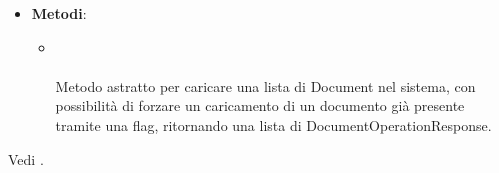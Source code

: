 \documentclass[10pt, a4paper]{article}
\begin{document}
\label{UploadDocumentsUseCaseDettaglio}
\begin{itemize}
    \item \textbf{Metodi}:
    \begin{itemize}
        \item {}\\ \\
        Metodo astratto per caricare una lista di Document nel sistema, con possibilità di forzare un caricamento di un documento già presente tramite una flag, ritornando una lista di DocumentOperationResponse.
    \end{itemize}
\end{itemize}




\begin{comment} %
\subsubsubsection{SubstituteDocumentController}
\label{SubstituteDocumentControllerDettaglio}
\begin{itemize}
    \item \textbf{Attributi}:
    \begin{itemize}
        \item \code{useCase: UploadDocumentsUseCase}.
    \end{itemize}
    \item \textbf{Metodi}:
    \begin{itemize}
        \item \code{substituteDocuments(newDocumentIds:List<string>):}\\ \code{List<DocumentOperationResponse>}\\
        Metodo che effettua la sostituzione di una lista di NewDocument tramite useCase, ritornando una lista di DocumentOperationResponse;
        \item \code{getTempDocument(documentId:string): Document}\\
        Metodo che recupera un documento caricato precedentemente dall'utente, a partire dal suo id, trasformandolo in oggetto Document della business logic.
    \end{itemize}
\end{itemize}
\end{comment}


Vedi .
\end{document}
